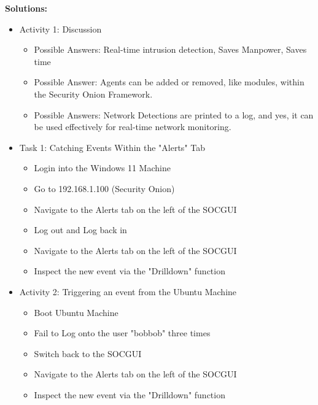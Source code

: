 \documentclass[12pt]{article}
\begin{document}
\pagebreak



\textbf{Solutions:}



\begin{itemize}
	\item Activity 1: Discussion
			\begin{itemize}

            \item Possible Answers: Real-time intrusion detection, Saves Manpower, Saves time
            \item Possible Answer: Agents can be added or removed, like modules, within the Security Onion Framework.
            \item Possible Answers: Network Detections are printed to a log, and yes, it can be used effectively for real-time network monitoring.
		\end{itemize} 
	
	\item Task 1: Catching Events Within the "Alerts" Tab
		\begin{itemize}
			\item Login into the Windows 11 Machine
			\item Go to 192.168.1.100 (Security Onion)
            \item Navigate to the Alerts tab on the left of the SOCGUI
			\item Log out and Log back in
            \item Navigate to the Alerts tab on the left of the SOCGUI
            \item Inspect the new event via the "Drilldown" function
			
		\end{itemize}
	\item Activity 2: Triggering an event from the Ubuntu Machine
		\begin{itemize}
			\item Boot Ubuntu Machine
			\item Fail to Log onto the user "bobbob" three times
            \item Switch back to the SOCGUI
            \item Navigate to the Alerts tab on the left of the SOCGUI
            \item Inspect the new event via the "Drilldown" function
			

\end{itemize}
\end{itemize}
\end{document}
